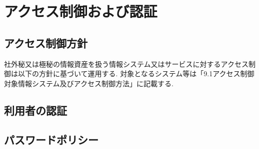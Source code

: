 \chapter{アクセス制御および認証}
\section{アクセス制御方針}
社外秘又は極秘の情報資産を扱う情報システム又はサービスに対するアクセス制御は以下の方針に基づいて運用する.
対象となるシステム等は「9.1アクセス制御対象情報システム及びアクセス制御方法」に記載する.
\section{利用者の認証}
\section{パスワードポリシー}